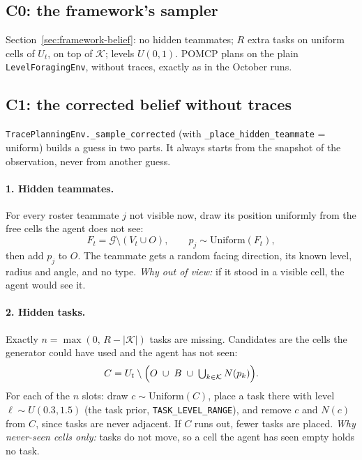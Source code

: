 \documentclass[11pt,a4paper]{article}
\newcommand{\code}[1]{\texttt{#1}}
\theoremstyle{remark}
\begin{document}
\subsection{C0: the framework's sampler}

Section~\ref{sec:framework-belief}: no hidden teammates; $R$ extra tasks on uniform cells of $U_t$, on top of
$\mathcal K$; levels $U(0,1)$. POMCP plans on the plain \code{LevelForagingEnv}, without traces, exactly as in the October
runs.

\subsection{C1: the corrected belief without traces}

\code{TracePlanningEnv.\_sample\_corrected} (with \code{\_place\_hidden\_teammate} = uniform) builds a guess in two parts.
It always starts from the snapshot of the observation, never from another guess.

\paragraph{1. Hidden teammates.} For every roster teammate $j$ not visible now, draw its position uniformly from the free
cells the agent does not see:
\begin{equation}
  F_t = \mathcal G \setminus (V_t \cup O), \qquad p_j \sim \mathrm{Uniform}(F_t),
  \label{eq:c1-mate}
\end{equation}
then add $p_j$ to $O$. The teammate gets a random facing direction, its known level, radius and angle, and no type.
\emph{Why out of view:} if it stood in a visible cell, the agent would see it.

\paragraph{2. Hidden tasks.} Exactly $n = \max(0,\, R - |\mathcal K|)$ tasks are missing. Candidates are the cells the
generator could have used and the agent has not seen:
\begin{equation}
  C = U_t \setminus \Bigl(O \;\cup\; B \;\cup\; \textstyle\bigcup_{k\in\mathcal K} N(p_k)\Bigr).
  \label{eq:c1-task-cells}
\end{equation}
For each of the $n$ slots: draw $c\sim\mathrm{Uniform}(C)$, place a task there with level $\ell\sim U(0.3,1.5)$ (the task
prior, \code{TASK\_LEVEL\_RANGE}), and remove $c$ and $N(c)$ from $C$, since tasks are never adjacent. If $C$ runs out,
fewer tasks are placed.
\emph{Why never-seen cells only:} tasks do not move, so a cell the agent has seen empty holds no task.
\end{document}
